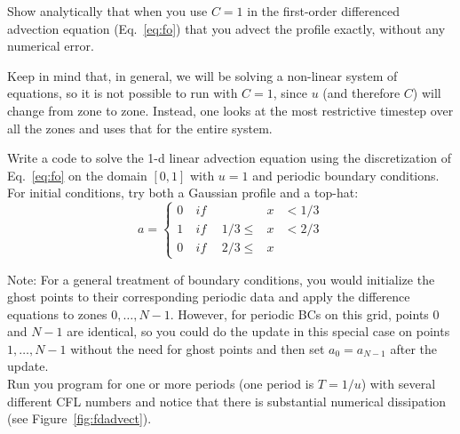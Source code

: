 \begin{exercise}
{Show analytically that when you use $C=1$ in the
  first-order differenced advection equation (Eq.~\ref{eq:fo}) that
  you advect the profile exactly, without any numerical error.}
\end{exercise}

Keep in mind that, in general, we will be solving a non-linear
system of equations, so it is not possible to run with $C=1$, 
since $u$ (and therefore $C$) will change from zone to zone.
Instead, one looks at the most restrictive timestep over all the
zones and uses that for the entire system.


\begin{exercise}
{Write a code to solve the 1-d linear advection equation
  using the discretization of Eq.~\ref{eq:fo} on the domain $[0,1]$ with
  $u=1$ and periodic boundary conditions.  For initial conditions,
  try both a Gaussian profile and a top-hat:}
  \begin{equation}
  a = \left \{
      \begin{array}{lllll}0 & \mathit{~if~~} &         &x& < 1/3 \\
                          1 & \mathit{~if~~} & 1/3 \le &x& < 2/3 \\
                          0 & \mathit{~if~~} & 2/3 \le &x&
      \end{array}
      \right .
  \end{equation}

  \noindent Note: For a general treatment of boundary conditions, you would
    initialize the ghost points to their corresponding periodic data
    and apply the difference equations to zones $0, \ldots, N-1$.
    However, for periodic BCs on this grid, points $0$ and $N-1$ are
    identical, so you could do the update in this special case on
    points $1, \ldots, N-1$ without the need for ghost points and then
    set $a_0 = a_{N-1}$ after the update. \\

  \noindent Run you program for one or more periods (one period
    is $T=1/u$) with several different CFL numbers and notice that
    there is substantial numerical dissipation (see Figure~\ref{fig:fdadvect}).
\end{exercise}

